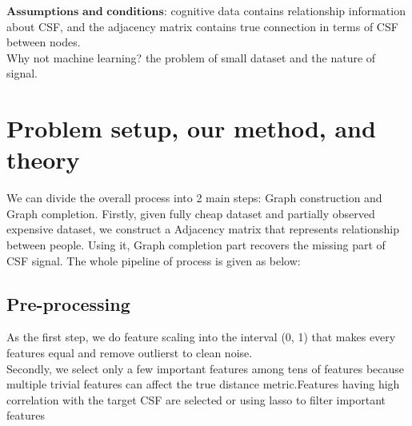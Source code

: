 \documentclass{article}
\theoremstyle{definition}
\begin{document}
$\textbf{Assumptions and conditions}$: cognitive data contains relationship information about CSF, and the adjacency matrix contains true connection in terms of CSF between nodes.\\
Why not machine learning? the problem of small dataset and the nature of signal.

\section{Problem setup, our method, and theory}
We can divide the overall process into 2 main steps: Graph construction and Graph completion. Firstly, given fully cheap dataset and partially observed expensive dataset, we construct a Adjacency matrix that represents relationship between people. Using it, Graph completion part recovers the missing part of CSF signal. The whole pipeline of process is given as below:

\subsection{Pre-processing}
As the first step, we do feature scaling into the interval (0, 1) that makes every features equal and remove outlierst to clean noise. \\
Secondly, we select only a few important features among tens of features because multiple trivial features can affect the true distance metric.Features having high correlation with the target CSF are selected or using lasso to filter important features
 
\end{document}
